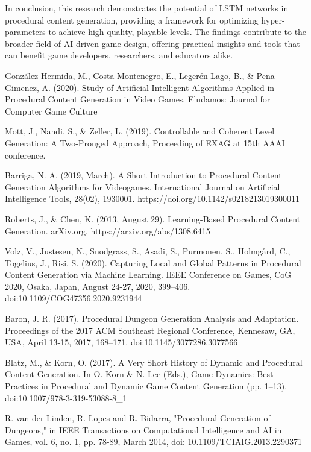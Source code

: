 \documentclass[runningheads]{llncs}
\begin{document}
In conclusion, this research demonstrates the potential of LSTM networks in procedural content generation, providing a framework for optimizing hyper-parameters to achieve high-quality, playable levels. The findings contribute to the broader field of AI-driven game design, offering practical insights and tools that can benefit game developers, researchers, and educators alike.

\begin{thebibliography}{8}

González-Hermida, M., Costa-Montenegro, E., Legerén-Lago, B., \& Pena-Gimenez, A. (2020). Study of Artificial Intelligent Algorithms Applied in Procedural Content Generation in Video Games. Eludamos: Journal for Computer Game Culture

Mott, J., Nandi, S., \& Zeller, L. (2019). Controllable and Coherent Level Generation: A Two-Pronged Approach, Proceeding of EXAG at 15th AAAI conference.

Barriga, N. A. (2019, March). A Short Introduction to Procedural Content Generation Algorithms for Videogames. International Journal on Artificial Intelligence Tools, 28(02), 1930001. https://doi.org/10.1142/s0218213019300011

Roberts, J., \& Chen, K. (2013, August 29). Learning-Based Procedural Content Generation. arXiv.org. https://arxiv.org/abs/1308.6415

Volz, V., Justesen, N., Snodgrass, S., Asadi, S., Purmonen, S., Holmgård, C., Togelius, J., Risi, S. (2020). Capturing Local and Global Patterns in Procedural Content Generation via Machine Learning. IEEE Conference on Games, CoG 2020, Osaka, Japan, August 24-27, 2020, 399–406. doi:10.1109/COG47356.2020.9231944

Baron, J. R. (2017). Procedural Dungeon Generation Analysis and Adaptation. Proceedings of the 2017 ACM Southeast Regional Conference, Kennesaw, GA, USA, April 13-15, 2017, 168–171. doi:10.1145/3077286.3077566

Blatz, M., \& Korn, O. (2017). A Very Short History of Dynamic and Procedural Content Generation. In O. Korn \& N. Lee (Eds.), Game Dynamics: Best Practices in Procedural and Dynamic Game Content Generation (pp. 1–13). doi:10.1007/978-3-319-53088-8\_1

R. van der Linden, R. Lopes and R. Bidarra, "Procedural Generation of Dungeons," in IEEE Transactions on Computational Intelligence and AI in Games, vol. 6, no. 1, pp. 78-89, March 2014, doi: 10.1109/TCIAIG.2013.2290371


\end{thebibliography}
\end{document}
